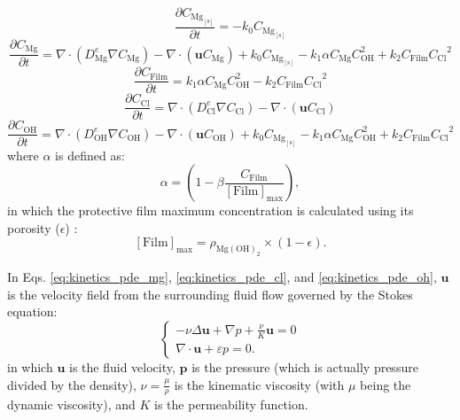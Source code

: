 \begin{equation} \label{eq:kinetics_pde_mg_solid}
\frac{\partial C_{\mathrm{Mg}_\mathrm{[s]}}}{\partial t}=-k_{0}C_{\mathrm{Mg}_\mathrm{[s]}}
\end{equation}
\begin{equation} \label{eq:kinetics_pde_mg}
\frac{\partial C_{\mathrm{Mg}}}{\partial t}=\nabla \cdot \left(D_{\mathrm{Mg}}^{e}  \nabla C_{\mathrm{Mg}} \right)-\nabla \cdot \left({\mathbf u} C_{\mathrm{Mg}} \right)+k_{0}C_{\mathrm{Mg}_\mathrm{[s]}}-k_{1}\alpha C_{\mathrm{Mg}}C_{\mathrm{OH}}^2 +k_{2} C_{\mathrm{Film}} {C_{\mathrm{Cl}}}^{2}
\end{equation}
\begin{equation} \label{eq:kinetics_pde_film}
\frac{\partial C_\mathrm{Film}}{\partial t}=k_{1}\alpha C_{\mathrm{Mg}}C_{\mathrm{OH}}^2 -k_{2} C_{\mathrm{Film}} {C_{\mathrm{Cl}}}^{2}
\end{equation}
\begin{equation} \label{eq:kinetics_pde_cl}
\frac{\partial C_{\mathrm{Cl}}}{\partial t}=\nabla \cdot \left(D_{\mathrm{Cl}}^{e}  \nabla C_{\mathrm{Cl}} \right)-\nabla \cdot \left({\mathbf u} C_{\mathrm{Cl}} \right)
\end{equation}
\begin{equation} \label{eq:kinetics_pde_oh}
\frac{\partial C_{\mathrm{OH}}}{\partial t}=\nabla \cdot \left(D_{\mathrm{OH}}^{e}  \nabla C_{\mathrm{OH}} \right)-\nabla \cdot \left({\mathbf u} C_{\mathrm{OH}} \right)+k_{0}C_{\mathrm{Mg}_\mathrm{[s]}}-k_{1}\alpha C_{\mathrm{Mg}}C_{\mathrm{OH}}^2 +k_{2} C_{\mathrm{Film}} {C_{\mathrm{Cl}}}^{2}
\end{equation}
where $\alpha$ is defined as:
\begin{equation} \label{eq:kinetics_film_alpha}
\alpha=\left(1-\beta \frac{C_{\mathrm{Film}}}{[\mathrm{Film}]_{\max }}\right),
\end{equation}
in which the protective film maximum concentration is calculated using its porosity ($\epsilon$) \cite{Bajger2016}:
\begin{equation} \label{eq:kinetics_film_max}
[\mathrm{Film}]_{\max }=\rho_{\mathrm{Mg}(\mathrm{OH})_{2}} \times(1-\epsilon).
\end{equation}

In Eqs. \ref{eq:kinetics_pde_mg}, \ref{eq:kinetics_pde_cl}, and \ref{eq:kinetics_pde_oh}, $\mathbf{u}$ is the velocity field from the surrounding fluid flow governed by the Stokes equation:
\begin{equation} \label{eq:kinetics_stokes}
\left\{ {\begin{array}{*{20}{l}}
\displaystyle  {- \nu\Delta \mathbf{u} + \nabla p + \frac{\nu}{K} \mathbf{u} = 0} \\ 
\displaystyle  {\nabla\cdot\mathbf{u} + \varepsilon p = 0.}
\end{array}} \right.
\end{equation}
in which $\mathbf{u}$ is the fluid velocity, $\mathbf{p}$ is the pressure (which is actually pressure divided by the density), $\nu = \frac{\mu}{\rho}$ is the kinematic viscosity (with $\mu$ being the dynamic viscosity), and $K$ is the permeability function.

